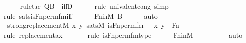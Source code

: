 \begin{isabellebody}
\ \ \ \ \isamarkupfalse%
{\isacharparenleft}{\kern0pt}rule{\isacharunderscore}{\kern0pt}tac\ Q{\isacharequal}{\kern0pt}{\isachardoublequoteopen}{\isacharquery}{\kern0pt}B{\isachardoublequoteclose}\ \ iffD{}{\isacharparenright}{\kern0pt}\isanewline
\ \ \ \ \ \isamarkupfalse%
{\isacharparenleft}{\kern0pt}rule\ univalent{\isacharunderscore}{\kern0pt}cong{\isacharcomma}{\kern0pt}\ simp{\isacharparenright}{\kern0pt}\isanewline
\ \ \ \ \ \isamarkupfalse%
{\isacharparenleft}{\kern0pt}rule\ sats{\isacharunderscore}{\kern0pt}is{\isacharunderscore}{\kern0pt}Fn{\isacharunderscore}{\kern0pt}perm{\isacharprime}{\kern0pt}{\isacharunderscore}{\kern0pt}fm{\isacharunderscore}{\kern0pt}iff{\isacharparenright}{\kern0pt}\isanewline
\ \ \ \ \isamarkupfalse%
\ Fn{\isacharunderscore}{\kern0pt}in{\isacharunderscore}{\kern0pt}M\ {\isacartoucheopen}{\isacharquery}{\kern0pt}B{\isacartoucheclose}\isanewline
\ \ \ \ \isamarkupfalse%
\ auto\isanewline
\isanewline
\ \ \isamarkupfalse%
\ {\isachardoublequoteopen}strong{\isacharunderscore}{\kern0pt}replacement{\isacharparenleft}{\kern0pt}{\isacharhash}{\kern0pt}{\isacharhash}{\kern0pt}M{\isacharcomma}{\kern0pt}\ {\isasymlambda}x\ y{\isachardot}{\kern0pt}\ sats{\isacharparenleft}{\kern0pt}M{\isacharcomma}{\kern0pt}\ is{\isacharunderscore}{\kern0pt}Fn{\isacharunderscore}{\kern0pt}perm{\isacharprime}{\kern0pt}{\isacharunderscore}{\kern0pt}fm{\isacharparenleft}{\kern0pt}{}{\isacharcomma}{\kern0pt}\ {}{\isacharcomma}{\kern0pt}\ {}{\isacharparenright}{\kern0pt}{\isacharcomma}{\kern0pt}\ {\isacharbrackleft}{\kern0pt}x{\isacharcomma}{\kern0pt}\ y{\isacharbrackright}{\kern0pt}\ {\isacharat}{\kern0pt}\ {\isacharbrackleft}{\kern0pt}Fn{\isacharbrackright}{\kern0pt}{\isacharparenright}{\kern0pt}{\isacharparenright}{\kern0pt}{\isachardoublequoteclose}\isanewline
\ \ \ \ \isamarkupfalse%
{\isacharparenleft}{\kern0pt}rule\ replacement{\isacharunderscore}{\kern0pt}ax{\isacharparenright}{\kern0pt}\isanewline
\ \ \ \ \ \ \isamarkupfalse%
{\isacharparenleft}{\kern0pt}rule\ is{\isacharunderscore}{\kern0pt}Fn{\isacharunderscore}{\kern0pt}perm{\isacharprime}{\kern0pt}{\isacharunderscore}{\kern0pt}fm{\isacharunderscore}{\kern0pt}type{\isacharparenright}{\kern0pt}\isanewline
\ \ \ \ \isamarkupfalse%
\ Fn{\isacharunderscore}{\kern0pt}in{\isacharunderscore}{\kern0pt}M\isanewline
\ \ \ \ \ \ \ \ \isamarkupfalse%
\ auto{\isacharbrackleft}{\kern0pt}{}{\isacharbrackright}{\kern0pt}\isanewline

\end{isabellebody}
